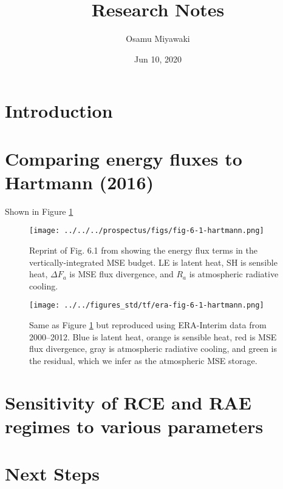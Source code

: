\documentclass[11pt]{article}
\author{Osamu Miyawaki}
\date{Jun 10, 2020}
\title{Research Notes}
\begin{document}
\maketitle

\section{Introduction}
\label{sec:org7ac9541}

\section{Comparing energy fluxes to Hartmann (2016)}
\label{sec:orgbca37f0}

Shown in Figure \ref{fig:org5afb225}

\begin{figure}[htbp]
\centering
\texttt{[image: ../../../prospectus/figs/fig-6-1-hartmann.png]}
\caption{\label{fig:org5afb225}Reprint of Fig. 6.1 from \cite{hartmann_important_2002} showing the energy flux terms in the vertically-integrated MSE budget. LE is latent heat, SH is sensible heat, \(\Delta F_a\) is MSE flux divergence, and \(R_a\) is atmospheric radiative cooling.}
\end{figure}

\begin{figure}[htbp]
\centering
\texttt{[image: ../../figures\_std/tf/era-fig-6-1-hartmann.png]}
\caption{\label{fig:org612c91a}Same as Figure \ref{fig:org5afb225} but reproduced using ERA-Interim data from 2000--2012. Blue is latent heat, orange is sensible heat, red is MSE flux divergence, gray is atmospheric radiative cooling, and green is the residual, which we infer as the atmospheric MSE storage.}
\end{figure}

\section{Sensitivity of RCE and RAE regimes to various parameters}
\label{sec:orgc3f32da}

\section{Next Steps}
\label{sec:org7e9e16a}



\end{document}
